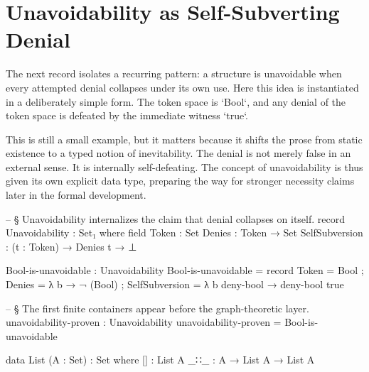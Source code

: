 \documentclass[11pt,a4paper]{book}
\begin{document}
\begin{center}
\end{center}

\section{Unavoidability as Self-Subverting Denial}

The next record isolates a recurring pattern: a structure is unavoidable when every attempted denial collapses under its own use. Here this idea is instantiated in a deliberately simple form. The token space is `Bool`, and any denial of the token space is defeated by the immediate witness `true`.

This is still a small example, but it matters because it shifts the prose from static existence to a typed notion of inevitability. The denial is not merely false in an external sense. It is internally self-defeating. The concept of unavoidability is thus given its own explicit data type, preparing the way for stronger necessity claims later in the formal development.

\begin{code}

-- § Unavoidability internalizes the claim that denial collapses on itself.
record Unavoidability : Set₁ where
  field
    Token  : Set
    Denies : Token → Set
    SelfSubversion : (t : Token) → Denies t → ⊥

Bool-is-unavoidable : Unavoidability
Bool-is-unavoidable = record
  { Token = Bool
  ; Denies = λ b → ¬ (Bool)
  ; SelfSubversion = λ b deny-bool → 
      deny-bool true
  }

-- § The first finite containers appear before the graph-theoretic layer.
unavoidability-proven : Unavoidability
unavoidability-proven = Bool-is-unavoidable

data List (A : Set) : Set where
  []  : List A
  _∷_ : A → List A → List A
\end{code}
\end{document}
